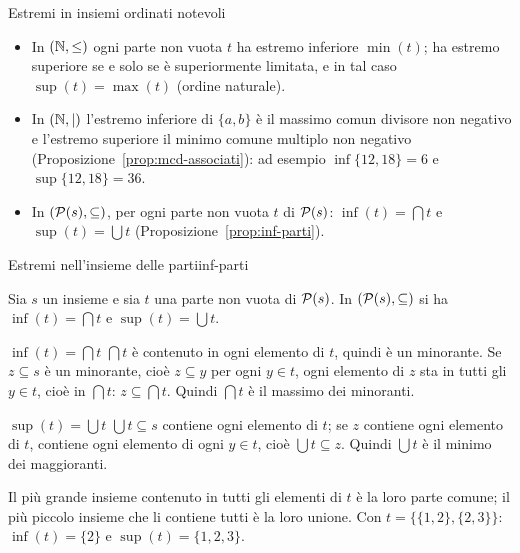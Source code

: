 \begin{esempio}{Estremi in insiemi ordinati notevoli}
    \begin{itemize}
        \item In $(\mathbb{N}, \leq)$ ogni parte non vuota $t$ ha estremo inferiore $\min(t)$; ha estremo superiore se e solo se è superiormente
              limitata, e in tal caso $\sup(t) = \max(t)$ (ordine naturale).
        \item In $(\mathbb{N}, \mid)$ l'estremo inferiore di $\{a, b\}$ è il massimo comun divisore non negativo e l'estremo superiore il minimo comune
              multiplo non negativo (Proposizione~\ref{prop:mcd-associati}): ad esempio $\inf\{12, 18\} = 6$ e $\sup\{12, 18\} = 36$.
        \item In $(\mathcal{P}(s), \subseteq)$, per ogni parte non vuota $t$ di $\mathcal{P}(s)$: $\inf(t) = \bigcap t$ e $\sup(t) = \bigcup t$
              (Proposizione~\ref{prop:inf-parti}).
    \end{itemize}
\end{esempio}

\begin{concetto}
\begin{Proposizione}{Estremi nell'insieme delle parti}{inf-parti}
    \begin{prerequisiti}
    \end{prerequisiti}
    Sia $s$ un insieme e sia $t$ una parte non vuota di $\mathcal{P}(s)$. In $(\mathcal{P}(s), \subseteq)$ si ha $\inf(t) = \bigcap t$ e $\sup(t) = \bigcup t$.
\end{Proposizione}
\begin{dimostrazione}
    \begin{caso}{$\inf(t) = \bigcap t$}
        $\bigcap t$ è contenuto in ogni elemento di $t$, quindi è un minorante. Se $z \subseteq s$ è un minorante, cioè $z \subseteq y$ per ogni $y \in t$,
        ogni elemento di $z$ sta in tutti gli $y \in t$, cioè in $\bigcap t$: $z \subseteq \bigcap t$. Quindi $\bigcap t$ è il massimo dei minoranti.
    \end{caso}
    \begin{caso}{$\sup(t) = \bigcup t$}
        $\bigcup t \subseteq s$ contiene ogni elemento di $t$; se $z$ contiene ogni elemento di $t$, contiene ogni elemento di ogni $y \in t$, cioè
        $\bigcup t \subseteq z$. Quindi $\bigcup t$ è il minimo dei maggioranti.
    \end{caso}
\end{dimostrazione}
\end{concetto}

\begin{spiegazione}
    Il più grande insieme contenuto in tutti gli elementi di $t$ è la loro parte comune; il più piccolo insieme che li contiene tutti è la
    loro unione. Con $t = \{\{1, 2\}, \{2, 3\}\}$: $\inf(t) = \{2\}$ e $\sup(t) = \{1, 2, 3\}$.
\end{spiegazione}
